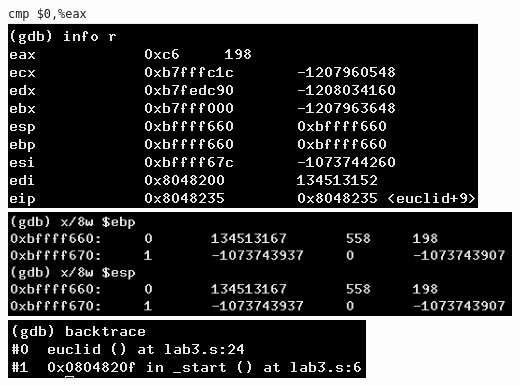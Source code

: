 \documentclass{article}
\begin{document}
\begin{minipage}{8cm}
\verb|cmp $0,%eax|\\
\includegraphics[scale=0.4]{info8.png} \\
\includegraphics[scale=0.4]{x8.png} \\
\includegraphics[scale=0.5]{bt8.png} \\
\end{minipage}
\clearpage
\end{document}
